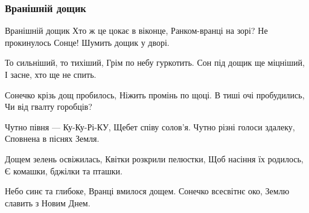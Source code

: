 
 
 

\subsubsection{Вранішній дощик}

Вранішній дощик
Хто ж це цокає в віконце,
Ранком-вранці на зорі?
Не прокинулось Сонце!
Шумить дощик у дворі.

То сильніший, то тихіший,
Грім по небу гуркотить.
Сон під дощик ще міцніший,
І засне, хто ще не спить.

Сонечко крізь дощ пробилось,
Ніжить промінь по щоці.
В тиші очі пробудились,
Чи від гвалту горобців?

Чутно півня — Ку-Ку-Рі-КУ,
Щебет співу солов’я.
Чутно різні голоси здалеку,
Сповнена в піснях Земля.

Дощем зелень освіжилась,
Квітки розкрили пелюстки,
Щоб насіння їх родилось,
Є комашки, бджілки та пташки.

Небо синє та глибоке,
Вранці вмилося дощем.
Сонечко всесвітнє око,
Землю славить з Новим Днем.
